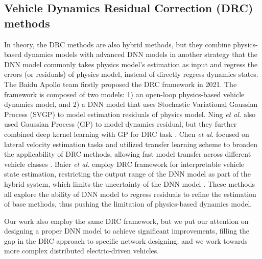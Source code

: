 \subsection{Vehicle Dynamics Residual Correction (DRC) methods}

In theory, the DRC methods are also hybrid methods, but they combine physics-based dynamics models with advanced DNN models in another strategy that the DNN model commonly takes physics model's estimation as input and regress the errors (or residuals) of physics model, instead of directly regress dynamics states.
The Baidu Apollo team firstly proposed the DRC framework \cite{DRC-baidu,DRC-baidu2} in 2021. The framework is composed of two models: 1) an open-loop physics-based vehicle dynamics model, and 2) a DNN model that uses Stochastic Variational Gaussian Process (SVGP) to model estimation residuals of physics model.
Ning \textit{et al.} also used Gaussian Process (GP) to model dynamics residual, but they further combined deep kernel learning with GP for DRC task \cite{pmlr-v229-ning23a}.
Chen \textit{et al.} focused on lateral velocity estimation tasks and utilized transfer learning scheme to broaden the applicability of DRC methods, allowing fast model transfer across different vehicle classes \cite{Chen2024}. 
Baier \textit{et al.} employ DRC framework for interpretable vehicle state estimation, restricting the output range of the DNN model as part of the hybrid system, which limits the uncertainty of the DNN model \cite{Baier2021HybridPA}.
These methods all explore the ability of DNN model to regress residuals to refine the estimation of base methods, thus pushing the limitation of physics-based dynamics model.
 
Our work also employ the same DRC framework, but we put our attention on designing a proper DNN model to achieve significant improvements, filling the gap in the DRC approach to specific network designing, and we work towards more complex distributed electric-driven vehicles.